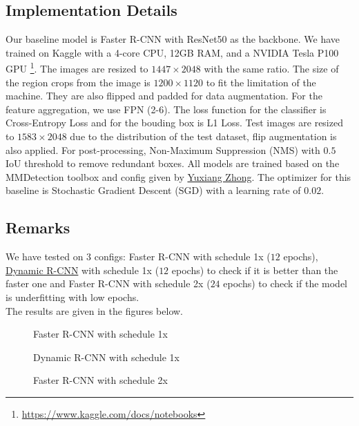 \subsection{Implementation Details}
Our baseline model is Faster R-CNN with ResNet50 as the backbone. We have trained on Kaggle with a 4-core CPU, 12GB RAM, and a NVIDIA Tesla P100 GPU \footnote{\url{https://www.kaggle.com/docs/notebooks}}. The images are resized to $1447 \times 2048$ with the same ratio. The size of the region crops from the image is $1200 \times 1120$ to fit the limitation of the machine. They are also flipped and padded for data augmentation. For the feature aggregation, we use FPN (2-6). The loss function for the classifier is Cross-Entropy Loss and for the bouding box is L1 Loss. Test images are resized to $1583 \times 2048$ due to the distribution of the test dataset, flip augmentation is also applied. For post-processing, Non-Maximum Suppression (NMS) with $0.5$ IoU threshold to remove redundant boxes. All models are trained based on the MMDetection toolbox and config given by \href{https://github.com/Yuxiang1995/ICDAR2021_MFD/blob/main/configs/_base_/models/faster_rcnn_r50_fpn.py}{Yuxiang Zhong}. The optimizer for this baseline is Stochastic Gradient Descent (SGD) with a learning rate of $0.02.$  
\subsection{Remarks}
We have tested on 3 configs: Faster R-CNN with schedule 1x ($12$ epochs), \href{https://github.com/hkzhang95/DynamicRCNN}{Dynamic R-CNN} with schedule 1x ($12$ epochs) to check if it is better than the faster one and Faster R-CNN with schedule 2x ($24$ epochs) to check if the model is underfitting with low epochs.\\
The results are given in the figures below. 
\begin{figure}[H]
\caption{Faster R-CNN with schedule 1x}
\end{figure}

\begin{figure}[H]
\caption{Dynamic R-CNN with schedule 1x}
\end{figure}

\begin{figure}[H]
\caption{Faster R-CNN with schedule 2x}
\end{figure}

